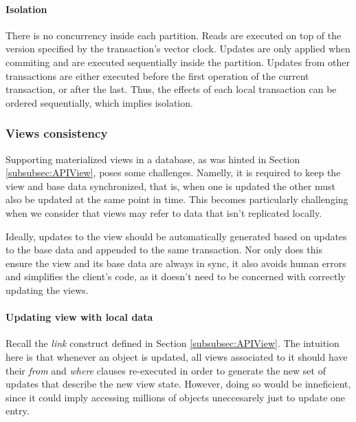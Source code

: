 \documentclass{vldb}
\begin{document}
\paragraph{Isolation} %
There is no concurrency inside each partition.
Reads are executed on top of the version specified by the transaction's vector clock. %
Updates are only applied when commiting and are executed sequentially inside the partition.
Updates from other transactions are either executed before the first operation of the current transaction, or after the last.
Thus, the effects of each local transaction can be ordered sequentially, which implies isolation.


\subsubsection{Views consistency}
\label{subsec:viewsconsistency}

Supporting materialized views in a database, as was hinted in Section \ref{subsubsec:APIView}, poses some challenges.
Namelly, it is required to keep the view and base data synchronized, that is, when one is updated the other must also be updated at the same point in time.
This becomes particularly challenging when we consider that views may refer to data that isn't replicated locally.

Ideally, updates to the view should be automatically generated based on updates to the base data and appended to the same transaction.
Nor only does this ensure the view and its base data are always in sync, it also avoids human errors and simplifies the client's code, as it doesn't need to be concerned with correctly updating the views.

\paragraph{Updating view with local data}
Recall the \emph{link} construct defined in Section \ref{subsubsec:APIView}.
The intuition here is that whenever an object is updated, all views associated to it should have their \emph{from} and \emph{where} clauses re-executed in order to generate the new set of updates that describe the new view state.
However, doing so would be inneficient, since it could imply accessing millions of objects uneccesarely just to update one entry.
\end{document}
